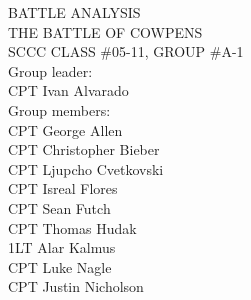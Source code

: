 




\pagestyle{scrheadings}
\ohead{\headmark}
%
\chead{}
\ifoot{}\ofoot{}
\cfoot{\pagemark}
\setheadsepline{.1pt}




\begin{titlepage}
  \thispagestyle{empty}
  \begin{center}
    \begin{singlespace}
      BATTLE ANALYSIS\\
      \vspace{3em}
      THE BATTLE OF COWPENS\\
      \vspace{3em}
      SCCC CLASS \#05-11, GROUP \#A-1\\
      \vspace{3em}
      Group leader:\\
      \vspace{1em}
      CPT Ivan Alvarado\\
      \vspace{2em}
      Group members:\\
      \vspace{1em}
      CPT George Allen\\
      CPT Christopher Bieber\\
      CPT Ljupcho Cvetkovski\\
      CPT Isreal Flores\\
      CPT Sean Futch\\
      CPT Thomas Hudak\\
      1LT Alar Kalmus\\
      CPT Luke Nagle\\
      CPT Justin Nicholson\\
    \end{singlespace}
  \end{center}
\end{titlepage}

\begin{singlespace}
  \pagestyle{empty}
  \setcounter{tocdepth}{2}
  \tableofcontents
  \clearpage
  \pagestyle{empty}
  \listoffigures
  \listoftables
  \clearpage
\end{singlespace}

\pagestyle{scrheadings}


\newpage


\newpage

\newpage

\newpage

\newpage

% 
% 



